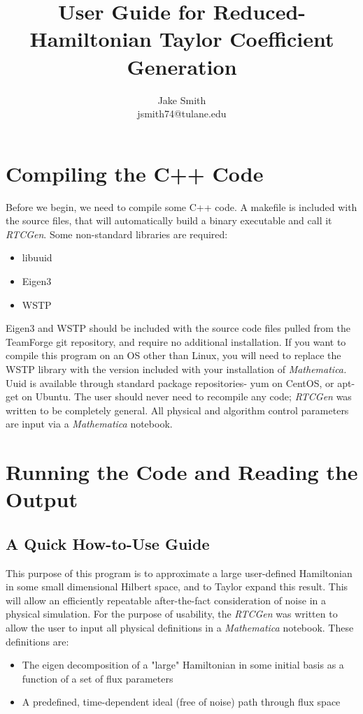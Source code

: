 \documentclass[12pt]{article}
\begin{document}
\title{User Guide for Reduced-Hamiltonian Taylor Coefficient Generation}
\author{Jake Smith \\ jsmith74@tulane.edu}
\maketitle

\tableofcontents
\section{Compiling the C++ Code}
Before we begin, we need to compile some C++ code. A makefile is included with the source files, that will automatically build a binary executable and call it \textit{RTCGen}. Some non-standard libraries are required:
\begin{itemize}
\item libuuid
\item Eigen3 
\item WSTP 
\end{itemize}
Eigen3 and WSTP should be included with the source code files pulled from the TeamForge git repository, and require no additional installation. If you want to compile this program on an OS other than Linux, you will need to replace the WSTP library with the version included with your installation of \textit{Mathematica.} Uuid is available through standard package repositories- yum on CentOS, or apt-get on Ubuntu. 
\newline
\newline
The user should never need to recompile any code; \textit{RTCGen} was written to be completely general. All physical and algorithm control parameters are input via a \textit{Mathematica} notebook.
\section{Running the Code and Reading the Output}
\subsection{A Quick How-to-Use Guide}
This purpose of this program is to approximate a large user-defined Hamiltonian in some small dimensional Hilbert space, and to Taylor expand this result. This will allow an efficiently repeatable after-the-fact consideration of noise in a physical simulation.
\newline
\newline
For the purpose of usability, the \textit{RTCGen} was written to allow the user to input all physical definitions in a \textit{Mathematica} notebook. These definitions are:
\newline
\newline
\begin{itemize}
\item The eigen decomposition of a "large" Hamiltonian in some initial basis as a function of a set of flux parameters
\newline
\item A predefined, time-dependent ideal (free of noise) path through flux space
\newline
\newline
\end{itemize}
\end{document}
